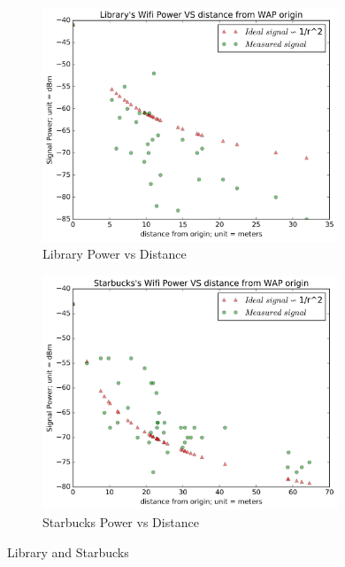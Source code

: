 \documentclass[usletter,12pt]{article}
\begin{document}
\begin{figure}[!h]
	\begin{subfigure}{0.5\textwidth}
		\centering
		\includegraphics[width=1\linewidth, height=7cm]{Librarypower.png} 
		\caption{Library Power vs Distance}
	\end{subfigure}
	\begin{subfigure}{0.5\textwidth}
	    \centering
		\includegraphics[width=1\linewidth, height=7cm]{Starbuckspower.png}
		\caption{Starbucks Power vs Distance}
	\end{subfigure}
	\caption{Library and Starbucks}
	\label{fig:plot1&2}
\end{figure}
\end{document}
